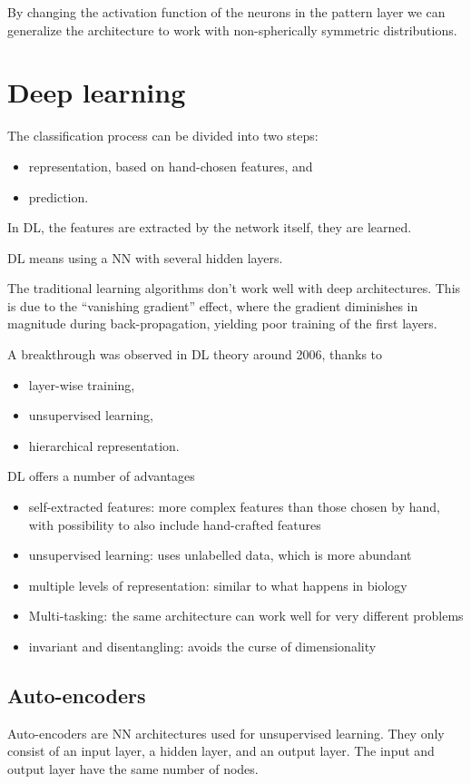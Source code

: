 \documentclass[oneside,onecolumn]{report}
\begin{document}
By changing the activation function of the neurons in the pattern layer we can generalize the architecture to work with non-spherically symmetric distributions.

\clearpage
\section{Deep learning}
The classification process can be divided into two steps:
\begin{itemize}
    \item representation, based on hand-chosen features, and
    \item prediction.
\end{itemize}
In DL, the features are extracted by the network itself, they are learned.

DL means using a NN with several hidden layers.

The traditional learning algorithms don't work well with deep architectures.
This is due to the ``vanishing gradient'' effect, where the gradient diminishes in magnitude during back-propagation, yielding poor training of the first layers.

A breakthrough was observed in DL theory around 2006, thanks to
\begin{itemize}
    \item layer-wise training,
    \item unsupervised learning,
    \item hierarchical representation.
\end{itemize}

DL offers a number of advantages
\begin{itemize}
    \item self-extracted features: more complex features than those chosen by hand, with possibility to also include hand-crafted features
    \item unsupervised learning: uses unlabelled data, which is more abundant
    \item multiple levels of representation: similar to what happens in biology
    \item Multi-tasking: the same architecture can work well for very different problems
    \item invariant and disentangling: avoids the curse of dimensionality
\end{itemize}


\subsection{Auto-encoders}
Auto-encoders are NN architectures used for unsupervised learning.
They only consist of an input layer, a hidden layer, and an output layer.
The input and output layer have the same number of nodes.
\end{document}
